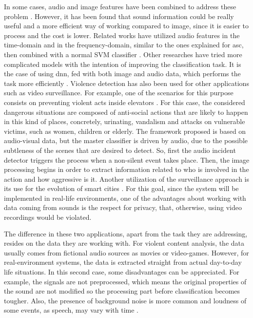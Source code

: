 	In some cases, audio and image features have been combined to address these problem \cite{Giannakopoulos2010}. However, it has been found that sound information could be really useful and a more efficient way of working compared to image, since it is easier to process and the cost is lower. Related works have utilized audio features in the time-domain and in the frequency-domain, similar to the ones explained for \acrshort{asc}, then combined with a normal SVM classifier \cite{Giannakopoulos2006}. Other researches have tried more complicated models with the intention of improving the classification task. It is the case of using \acrshort{dnn}, fed with both image and audio data, which performs the task more efficiently \cite{Ali2018}. Violence detection has also been used for other applications such as video surveillance. For example, one of the scenarios for this purpose consists on preventing violent acts inside elevators \cite{Chua2014}. For this case, the considered dangerous situations are composed of anti-social actions that are likely to happen in this kind of places, concretely, urinating, vandalism and attacks on vulnerable victims, such as women, children or elderly. The framework proposed is based on audio-visual data, but the master classifier is driven by audio, due to the possible subtleness of the scenes that are desired to detect. So, first the audio incident detector triggers the process when a non-silent event takes place. Then, the image processing begins in order to extract information related to who is involved in the action and how aggressive is it. Another utilization of the surveillance approach is its use for the evolution of smart cities \cite{Garcia-Gomez2016}. For this goal, since the system will be implemented in real-life environments, one of the advantages about working with data coming from sounds is the respect for privacy, that, otherwise, using video recordings would be violated.
	
	The difference in these two applications, apart from the task they are addressing, resides on the data they are working with. For violent content analysis, the data usually comes from fictional audio sources as movies or video-games. However, for real-environment systems, the data is extracted straight from actual day-to-day life situations. In this second case, some disadvantages can be appreciated. For example, the signals are not preprocessed, which means the original properties of the sound are not modified so the processing part before classification becomes tougher. Also, the presence of background noise is more common and loudness of some events, as speech, may vary with time \cite{Bautista-Duran2017}.

